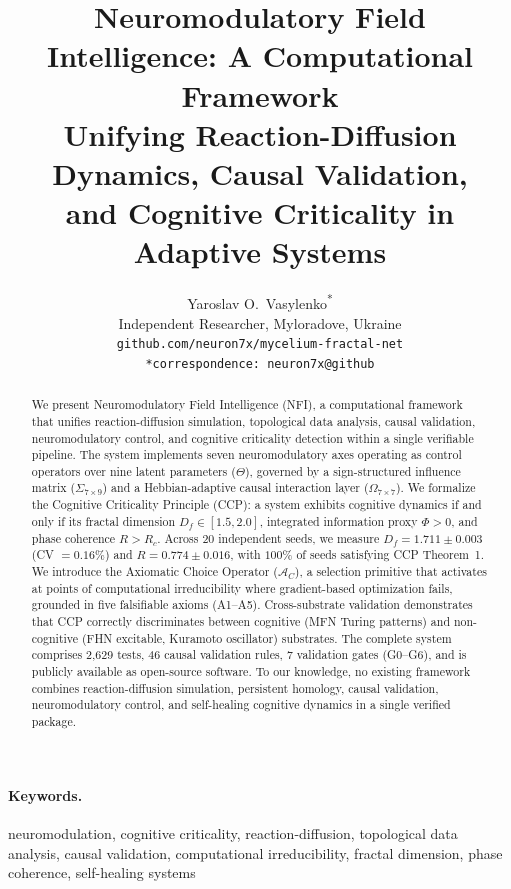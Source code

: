\documentclass[10pt,letterpaper]{article}
\title{%
  Neuromodulatory Field Intelligence: A Computational Framework\\
  Unifying Reaction-Diffusion Dynamics, Causal Validation,\\
  and Cognitive Criticality in Adaptive Systems%
}
\author{%
  Yaroslav O.\ Vasylenko\textsuperscript{*}\\
  \small Independent Researcher, Myloradove, Ukraine\\
  \small \texttt{github.com/neuron7x/mycelium-fractal-net}\\
  \small \texttt{*correspondence: neuron7x@github}
}
\date{}
\begin{document}
\maketitle

\begin{abstract}
We present Neuromodulatory Field Intelligence (NFI), a computational
framework that unifies reaction-diffusion simulation, topological data
analysis, causal validation, neuromodulatory control, and cognitive
criticality detection within a single verifiable pipeline. The system
implements seven neuromodulatory axes operating as control operators
over nine latent parameters ($\Theta$), governed by a sign-structured
influence matrix ($\Sigma_{7 \times 9}$) and a Hebbian-adaptive
causal interaction layer ($\Omega_{7 \times 7}$). We formalize the
Cognitive Criticality Principle (CCP): a system exhibits cognitive
dynamics if and only if its fractal dimension $D_f \in [1.5, 2.0]$,
integrated information proxy $\Phi > 0$, and phase coherence
$R > R_c$. Across 20 independent seeds, we measure
$D_f = 1.711 \pm 0.003$ (CV $= 0.16\%$) and $R = 0.774 \pm 0.016$,
with $100\%$ of seeds satisfying CCP Theorem~1. We introduce the
Axiomatic Choice Operator ($\mathcal{A}_C$), a selection primitive
that activates at points of computational irreducibility where
gradient-based optimization fails, grounded in five falsifiable axioms
(A1--A5). Cross-substrate validation demonstrates that CCP correctly
discriminates between cognitive (MFN Turing patterns) and non-cognitive
(FHN excitable, Kuramoto oscillator) substrates. The complete system
comprises 2,629 tests, 46 causal validation rules, 7 validation gates
(G0--G6), and is publicly available as open-source software. To our
knowledge, no existing framework combines reaction-diffusion simulation,
persistent homology, causal validation, neuromodulatory control, and
self-healing cognitive dynamics in a single verified package.
\end{abstract}

\paragraph{Keywords.}
neuromodulation, cognitive criticality, reaction-diffusion,
topological data analysis, causal validation, computational
irreducibility, fractal dimension, phase coherence, self-healing systems
\end{document}
